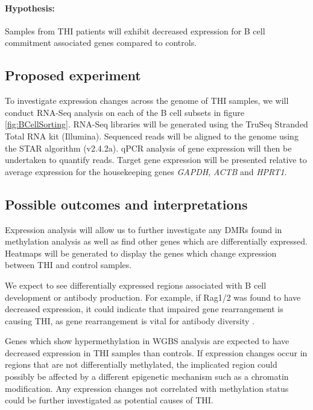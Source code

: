 \documentclass[12pt]{article}
\begin{document}
		\paragraph{Hypothesis:}
			
			Samples from THI patients will exhibit decreased expression for B cell commitment associated genes compared to controls.
					
		\subsection{Proposed experiment}
			
			To investigate expression changes across the genome of THI samples, we will conduct RNA-Seq analysis on each of the B cell subsets in figure \ref{fig:BCellSorting}. 
			RNA-Seq libraries will be generated using the TruSeq Stranded Total RNA kit (Illumina). 
			Sequenced reads will be aligned to the genome using the STAR algorithm (v2.4.2a)\citep{Dobin13}.
			qPCR analysis of gene expression will then be undertaken to quantify reads. 
			Target gene expression will be presented relative to average expression for the housekeeping genes \textit{GAPDH}, \textit{ACTB} and \textit{HPRT1}.
			
		\subsection{Possible outcomes and interpretations}				
			
			Expression analysis will allow us to  further investigate any DMRs found in methylation analysis as well as find other genes which are differentially expressed. 
			Heatmaps will be generated to display the genes which change expression between THI and control samples.
			
			We expect to see differentially expressed regions associated with B cell development or antibody production. 
			For example, if Rag1/2 was found to have decreased expression, it could indicate that impaired gene rearrangement is causing THI, as gene rearrangement is vital for antibody diversity \citep{Choukrallah14}.
			
			Genes which show hypermethylation in WGBS analysis are expected to have decreased expression in THI samples than controls. 
			If expression changes occur in regions that are not differentially methylated, the implicated region could possibly be affected by a different epigenetic mechanism such as a chromatin modification.
			Any expression changes not correlated with methylation status could be further investigated as potential causes of THI.
			
\end{document}
